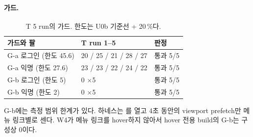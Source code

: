 \paragraph{가드.}
\begin{table}[H]
  \caption{T 5 run의 가드. 한도는 U0b 기준선 + 20\,\%다.}
  \label{tab:re-aba-guards}
  \centering\small
  \begin{tabularx}{\linewidth}{@{}Y L{3.4cm} L{2.4cm}@{}}
    \toprule
    가드와 팔 & T run 1--5 & 판정 \\
    \midrule
    G-a 로그인 (한도 45.6) & 20 / 25 / 21 / 28 / 27 & 통과 5/5 \\
    \midrule
    G-a 익명 (한도 27.6) & 23 / 23 / 22 / 24 / 22 & 통과 5/5 \\
    \midrule
    G-b 로그인 (한도 5) & 0 $\times$5 & 통과 5/5 \\
    \midrule
    G-b 익명 (한도 2) & 0 $\times$5 & 통과 5/5 \\
    \bottomrule
  \end{tabularx}
\end{table}
G-b에는 측정 범위 한계가 있다. 하네스는 \code{/}를 열고 4초 동안의 viewport prefetch만 메뉴 링크별로 센다.
W4가 메뉴 링크를 hover하지 않아서 hover 전용 build의 G-b는 구성상 0이다.

